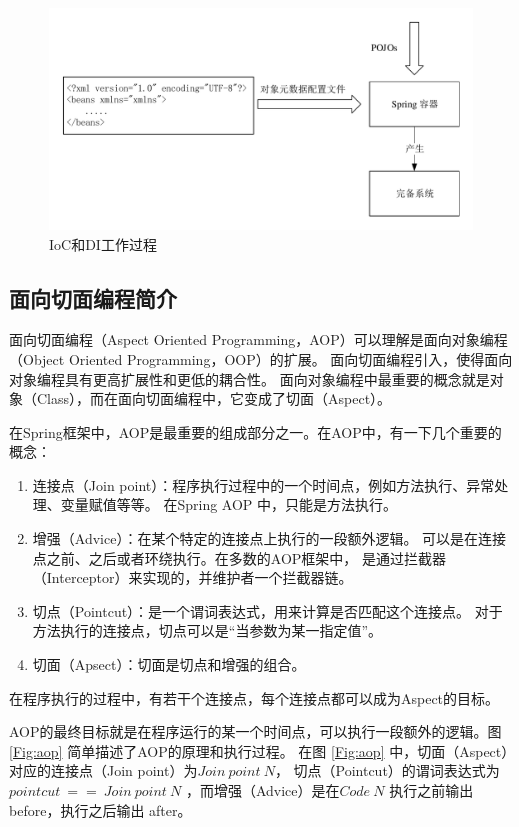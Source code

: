 \begin{figure}[ht]
    \centering   
    \includegraphics[width=1\linewidth]{./Figure/IMG_container.pdf}
    \caption{IoC和DI工作过程}\label{Fig:container}
\end{figure}

\subsection{面向切面编程简介}
面向切面编程（Aspect Oriented Programming，AOP）可以理解是面向对象编程（Object Oriented Programming，OOP）的扩展。
面向切面编程引入，使得面向对象编程具有更高扩展性和更低的耦合性。
面向对象编程中最重要的概念就是对象（Class），而在面向切面编程中，它变成了切面（Aspect）。

在Spring框架中，AOP是最重要的组成部分之一。在AOP中，有一下几个重要的概念：
\begin{enumerate}
    \item 连接点（Join point）：程序执行过程中的一个时间点，例如方法执行、异常处理、变量赋值等等。
    在Spring AOP 中，只能是方法执行。
    \item 增强（Advice）：在某个特定的连接点上执行的一段额外逻辑。
    可以是在连接点之前、之后或者环绕执行。在多数的AOP框架中，
    是通过拦截器（Interceptor）来实现的，并维护者一个拦截器链。
    \item 切点（Pointcut）：是一个谓词表达式，用来计算是否匹配这个连接点。
    对于方法执行的连接点，切点可以是“当参数为某一指定值”。
    \item 切面（Apsect）：切面是切点和增强的组合。
\end{enumerate}

在程序执行的过程中，有若干个连接点，每个连接点都可以成为Aspect的目标。

AOP的最终目标就是在程序运行的某一个时间点，可以执行一段额外的逻辑。图 \ref{Fig:aop} 
简单描述了AOP的原理和执行过程。
在图 \ref{Fig:aop} 中，切面（Aspect）对应的连接点（Join point）为$Join\ point\ N$，
切点（Pointcut）的谓词表达式为$ pointcut\ ==\ Join\ point\ N$
，而增强（Advice）是在$Code\ N$ 执行之前输出 before，执行之后输出 after。

